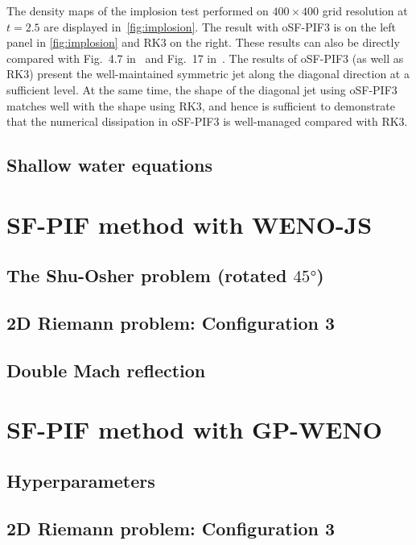 The density maps of the implosion test performed on
\( 400 \times 400 \) grid resolution at \( t = 2.5 \) are displayed in~\cref{fig:implosion}.
The result with oSF-PIF3 is on the left panel in \cref{fig:implosion} and RK3 on the right.
These results can also be directly compared with
Fig.~4.7 in~\cite{liska2003comparison} and Fig.~17 in~\cite{stone2008athena}.
The results of oSF-PIF3 (as well as RK3) present
the well-maintained symmetric jet along the diagonal direction
at a sufficient level.
At the same time, the shape of the diagonal jet using oSF-PIF3 matches
well with the shape using RK3,
and hence is sufficient to demonstrate that the numerical dissipation in oSF-PIF3
is well-managed compared with RK3.


\subsection{Shallow water equations}\label{subsec:shallow}



\section{SF-PIF method with WENO-JS}\label{sec:result_wenojs}


\subsection{The Shu-Osher problem (rotated \(\ang{45}\))}\label{subsec:shu45_weno}

\subsection{2D Riemann problem: Configuration 3}\label{subsec:2drp_c3_weno}

\subsection{Double Mach reflection}\label{subsec:dmr_weno}



\section{SF-PIF method with GP-WENO}\label{sec:result_gpweno}

\subsection{Hyperparameters}\label{subsec:hyper_params_gpweno}

\subsection{2D Riemann problem: Configuration 3}\label{subsec:2drp_c3_gp}


